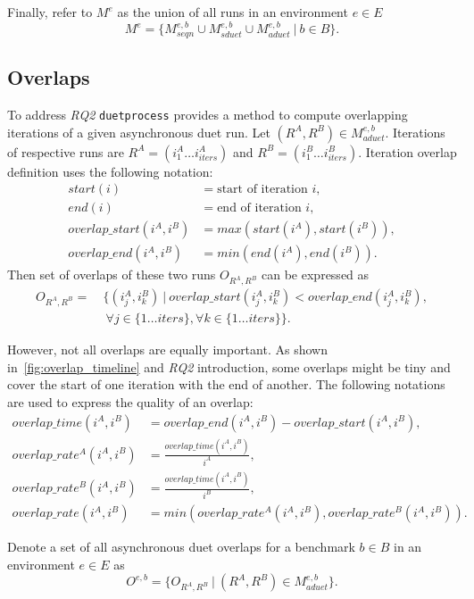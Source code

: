Finally, refer to $M^e$ as the union of all runs in an environment $e \in E$
$$
M^e = \{ M^{e, b}_{seqn} \cup M^{e, b}_{sduet} \cup M^{e, b}_{aduet} ~|~ b \in B \}.
$$


\subsection{Overlaps}
\label{sec:overlaps}

To address \emph{RQ2} \lstinline{duetprocess} provides a method to compute overlapping iterations of a given asynchronous duet run.
Let $(R^A, R^B) \in M^{e, b}_{aduet}$.
Iterations of respective runs are $R^A = (i^A_1 \dots i^A_{iters})$ and $R^B = (i^B_1 \dots i^B_{iters})$.
Iteration overlap definition uses the following notation:
\begin{align*}
start(i) &= \text{start of iteration } i,\\
end(i) &= \text{end of iteration } i,\\
overlap\_start(i^A, i^B) &= max(start(i^A), start(i^B)),\\
overlap\_end(i^A, i^B) &= min(end(i^A), end(i^B)).
\end{align*} 
Then set of overlaps of these two runs $O_{R^A, R^B}$ can be expressed as
\begin{align*}
O_{R^A, R^B} =&~\{(i^A_j, i^B_k)~|~overlap\_start(i^A_j, i^B_k) < overlap\_end(i^A_j, i^B_k),\\
              &~~\forall j \in \{1 \dots iters\}, \forall k \in \{1 \dots iters\}\}.
\end{align*} 

However, not all overlaps are equally important.
As shown in~\cref{fig:overlap_timeline} and \emph{RQ2} introduction, some overlaps might be tiny and cover the start of one iteration with the end of another.
The following notations are used to express the quality of an overlap:
\begin{align*}
overlap\_time(i^A, i^B) &= overlap\_end(i^A, i^B) - overlap\_start(i^A, i^B), \\
overlap\_rate^A(i^A, i^B) &= \frac{overlap\_time(i^A, i^B)}{i^A}, \\
overlap\_rate^B(i^A, i^B) &= \frac{overlap\_time(i^A, i^B)}{i^B}, \\
overlap\_rate(i^A, i^B) &= min(overlap\_rate^A(i^A, i^B), overlap\_rate^B(i^A, i^B)).
\end{align*}

Denote a set of all asynchronous duet overlaps for a benchmark $b \in B$ in an environment $e \in E$ as
\begin{equation}\label{eq:overlap_set}
O^{e,b} = \{O_{R^A, R^B}~|~(R^A, R^B) \in M^{e,b}_{aduet}\}.
\end{equation}
